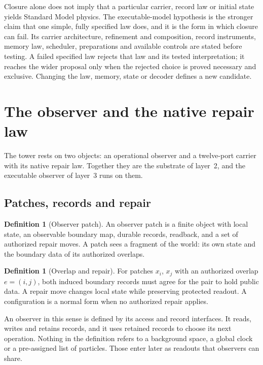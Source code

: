 \documentclass[11pt]{article}
\theoremstyle{definition}
\newtheorem{definition}[theorem]{Definition}
\theoremstyle{remark}
\begin{document}
Closure alone does not imply that a particular carrier, record law or initial
state yields Standard Model physics. The executable-model hypothesis is the
stronger claim that one simple, fully specified law does, and it is the form
in which closure can fail. Its carrier architecture, refinement and
composition, record instruments, memory law, scheduler, preparations and
available controls are stated before testing. A failed specified law
rejects that law and its tested interpretation; it reaches the wider
proposal only when the rejected choice is proved necessary and exclusive.
Changing the law, memory, state or decoder defines a new candidate.

\section{The observer and the native repair law}
\label{sec:architecture}

The tower rests on two objects: an operational observer and a twelve-port
carrier with its native repair law. Together they are the substrate of
layer~2, and the executable observer of layer~3 runs on them.

\subsection{Patches, records and repair}

\begin{definition}[Observer patch]
An observer patch is a finite object with local state, an observable boundary
map, durable records, readback, and a set of authorized repair moves. A
patch sees a fragment of the world: its own state and the boundary data of
its authorized overlaps.
\end{definition}

\begin{definition}[Overlap and repair]
For patches $x_i$, $x_j$ with an authorized overlap $e=(i,j)$, both induced
boundary records must agree for the pair to hold public data. A repair move
changes local state while preserving protected readout. A configuration is a
normal form when no authorized repair applies.
\end{definition}

An observer in this sense is defined by its access and record interfaces.
It reads, writes and retains records, and it uses retained records to choose
its next operation. Nothing in the definition refers to a background space,
a global clock or a pre-assigned list of particles. Those enter later as
readouts that observers can share.
\end{document}
